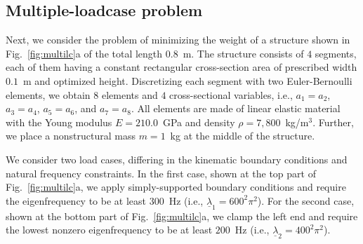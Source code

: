 \documentclass[final,onefignum,onetabnum]{siamart220329}
\begin{document}
{
\subsection{Multiple-loadcase problem}

Next, we consider the problem of minimizing the weight of a structure shown in Fig.~\ref{fig:multilc}a of the total length $0.8$~m. The structure consists of $4$ segments, each of them having a constant rectangular cross-section area of prescribed width $0.1$~m and optimized height. Discretizing each segment with two Euler-Bernoulli elements, we obtain $8$ elements and $4$ cross-sectional variables, i.e., $a_1 = a_2$, $a_3=a_4$, $a_5=a_6$, and $a_7=a_8$. All elements are made of linear elastic material with the Young modulus $E=210.0$~GPa and density $\rho=7,800$~kg/m$^3$. Further, we place a nonstructural mass $m=1$~kg at the middle of the structure.

We consider two load cases, differing in the kinematic boundary conditions and natural frequency constraints. In the first case, shown at the top part of Fig.~\ref{fig:multilc}a, we apply simply-supported boundary conditions and require the eigenfrequency to be at least $300$~Hz (i.e., $\underline{\lambda}_1 = 600^2\pi^2$). For the second case, shown at the bottom part of Fig.~\ref{fig:multilc}a, we clamp the left end and require the lowest nonzero eigenfrequency to be at least $200$~Hz (i.e., $\underline{\lambda}_2 = 400^2\pi^2$).

\begin{figure}[!htbp]
\begin{subfigure}{0.5\linewidth}
\end{subfigure}
\end{figure}}
\end{document}
